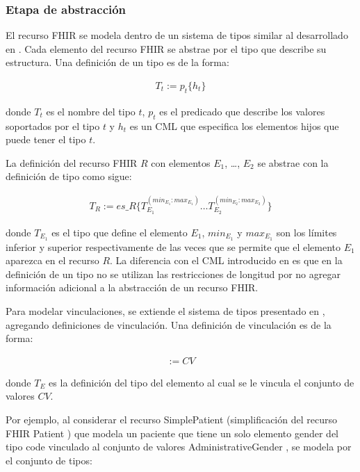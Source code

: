 \subsubsection{Etapa de abstracción}

El recurso FHIR se modela dentro de un sistema de tipos similar al desarrollado en \cite{Maldonado09}. Cada elemento del recurso FHIR se abstrae por el tipo que describe su estructura. Una definición de un tipo es de la forma:

\begin{align*}
T_t:=p_t\{h_t\}
\end{align*}

\noindent
donde \(T_t\) es el nombre del tipo \(t\), \(p_t\) es el predicado que describe los valores soportados por el tipo \(t\) y \(h_t\) es un CML que especifica los elementos hijos que puede tener el tipo \(t\).

La definición del recurso FHIR \(R\) con elementos \(E_1\), \dots , \(E_2\) se abstrae con la definición de tipo como sigue:

\begin{align*}
T_R:=es\_R\{T_{E_1}^{(min_{E_1} \colon max_{E_1})} \dots T_{E_2}^{(min_{E_2} \colon max_{E_2})}\}
\end{align*}

\noindent
donde \(T_{E_1}\) es el tipo que define el elemento \(E_1\), \(min_{E_1}\) y \(max_{E_1}\) son los límites inferior y superior respectivamente de las veces que se permite que el elemento \(E_1\) aparezca en el recurso \(R\). La diferencia con el CML introducido en \cite{Maldonado09} es que en la definición de un tipo no se utilizan las restricciones de longitud por no agregar información adicional a la abstracción de un recurso FHIR.

Para modelar vinculaciones, se extiende el sistema de tipos presentado en \cite{Maldonado09}, agregando definiciones de vinculación. Una definición de vinculación es de la forma:

\begin{align*}
[T_E] := CV
\end{align*}

\noindent
donde \(T_E\) es la definición del tipo del elemento al cual se le vincula el conjunto de valores \(CV\).

Por ejemplo, al considerar el recurso SimplePatient (simplificación del recurso FHIR Patient \cite{FHIRPatient}) que modela un paciente que tiene un solo elemento gender del tipo code \cite{FHIRDataTypes} vinculado al conjunto de valores AdministrativeGender \cite{FHIRAdministrativeGender}, se modela por el conjunto de tipos:

